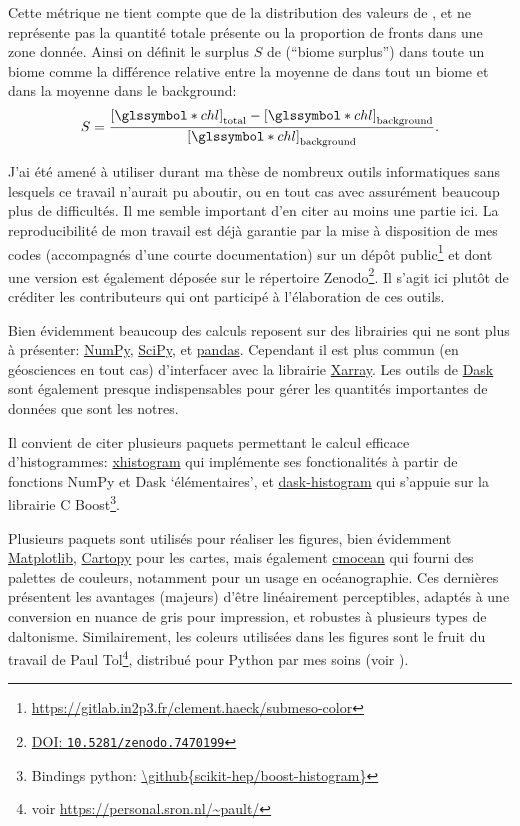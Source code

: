 \documentclass[index]{subfiles}
\begin{document}
Cette métrique ne tient compte que de la distribution des valeurs de , et ne représente pas la quantité totale présente ou la proportion de fronts dans une zone donnée.
Ainsi on définit le surplus \(S\) de  (\enquote{biome surplus}) dans toute un biome comme la différence relative entre la moyenne de  dans tout un biome et dans la moyenne dans le background:
\begin{equation}
  S = \frac{\moy{\am{chl}}_\tot - \moy{\am{chl}}_\bkg}
  {\moy{\am{chl}}_\bkg} .
\end{equation}

\label{sec:ref-info}

J'ai été amené à utiliser durant ma thèse de nombreux outils informatiques sans lesquels ce travail n'aurait pu aboutir, ou en tout cas avec assurément beaucoup plus de difficultés.
Il me semble important d'en citer au moins une partie ici.
La reproducibilité de mon travail est déjà garantie par la mise à disposition de mes codes (accompagnés d'une courte documentation) sur un dépôt public\footnote{%
  \url{https://gitlab.in2p3.fr/clement.haeck/submeso-color}
}
et dont une version est également déposée sur le répertoire Zenodo\footnote{%
  \href{https://doi.org/10.5281/zenodo.7470199}%
  {\textsc{DOI}: \texttt{10.5281/zenodo.7470199}}
}.
Il s'agit ici plutôt de créditer les contributeurs qui ont participé à l'élaboration de ces outils.

Bien évidemment beaucoup des calculs reposent sur des librairies qui ne sont plus à présenter: \href{https://numpy.org}{NumPy}, \href{https://scipy.org}{SciPy}, et \href{https://pandas.pydata.org}{pandas}.
Cependant il est plus commun (en géosciences en tout cas) d'interfacer avec la librairie \href{https://xarray.dev}{Xarray}.
Les outils de \href{https://www.dask.org}{Dask} sont également presque indispensables pour gérer les quantités importantes de données que sont les notres.

Il convient de citer plusieurs paquets permettant le calcul efficace d'histogrammes:
\href{\github{xgcm/xhistogram}}{xhistogram} qui implémente ses fonctionalités à partir de fonctions NumPy et Dask \enquote*{élémentaires}, et
\href{\github{dask-contrib/dask-histogram}}{dask-histogram} qui s'appuie sur la librairie C Boost\footnote{
  Bindings python: \url{\github{scikit-hep/boost-histogram}}}.

Plusieurs paquets sont utilisés pour réaliser les figures, bien évidemment \href{https://matplotlib.org}{Matplotlib},
\href{https://scitools.org.uk/cartopy/docs/latest/}{Cartopy} pour les cartes,
mais également \href{https://matplotlib.org/cmocean/}{cmocean} qui fourni des palettes de couleurs, notamment pour un usage en océanographie. Ces dernières présentent les avantages (majeurs) d'être linéairement perceptibles, adaptés à une conversion en nuance de gris pour impression, et robustes à plusieurs types de daltonisme.
Similairement, les coleurs utilisées dans les figures sont le fruit du travail de Paul Tol\footnote{voir \url{https://personal.sron.nl/~pault/}}, distribué pour Python par mes soins (voir ).
\end{document}
